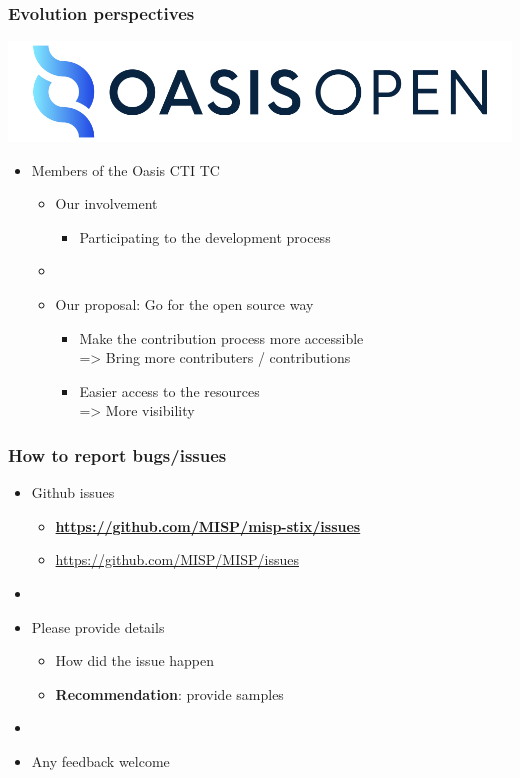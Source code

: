 \begin{frame}
    \frametitle{Evolution perspectives}
    \begin{center}
        \includegraphics[scale=0.1]{images/oasis.png}
    \end{center}
    \vspace{1em}
    \begin{itemize}
        \item Members of the Oasis CTI TC
        \begin{itemize}
            \item Our involvement
            \begin{itemize}
                \item Participating to the development process
            \end{itemize}
            \item []
            \item Our proposal: Go for the open source way
            \begin{itemize}
                \item Make the contribution process more accessible \\
                => Bring more contributers / contributions
                \item Easier access to the resources \\
                => More visibility
            \end{itemize}
        \end{itemize}
    \end{itemize}
\end{frame}

\begin{frame}
    \frametitle{How to report bugs/issues}
    \begin{itemize}
        \item Github issues
        \begin{itemize}
            \item {\bf \url{https://github.com/MISP/misp-stix/issues}}
            \item \url{https://github.com/MISP/MISP/issues}
        \end{itemize}
        \item []
        \item Please provide details
        \begin{itemize}
            \item How did the issue happen
            \item {\bf Recommendation}: provide samples
        \end{itemize}
        \item[]
        \item Any feedback welcome
    \end{itemize}
\end{frame}

